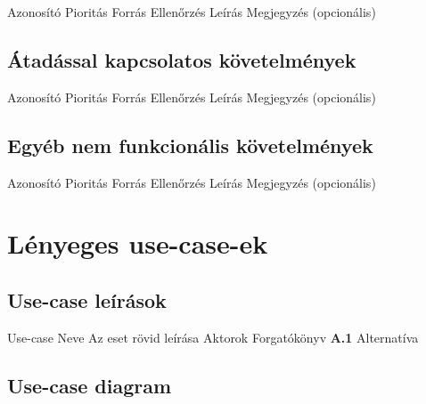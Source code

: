 \begin{kovetelmeny}
	{Azonosító} %
	{Pioritás} %
	{Forrás} %
	{Ellenőrzés} %
	{Leírás} %
    Megjegyzés (opcionális)
\end{kovetelmeny}

\subsection{Átadással kapcsolatos követelmények}
\begin{kovetelmeny}
    {Azonosító} %
    {Pioritás} %
    {Forrás} %
    {Ellenőrzés} %
    {Leírás} %
    Megjegyzés (opcionális)
\end{kovetelmeny}

\subsection{Egyéb nem funkcionális követelmények}
\begin{kovetelmeny}
    {Azonosító} %
    {Pioritás} %
    {Forrás} %
    {Ellenőrzés} %
    {Leírás} %
    Megjegyzés (opcionális)
\end{kovetelmeny}

\section{Lényeges use-case-ek}
\subsection{Use-case leírások}
\begin{use-case}
	{Use-case Neve}
	{Az eset rövid leírása}
	{Aktorok}
	Forgatókönyv \newline 
        \textbf{A.1} Alternatíva
\end{use-case}

\subsection{Use-case diagram}

